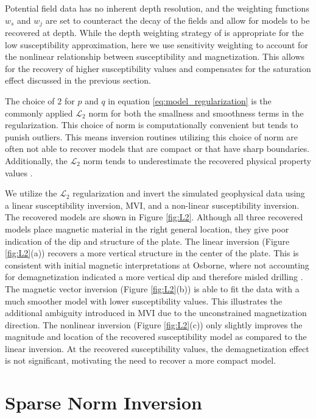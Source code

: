 \documentclass{segabs}
\begin{document}
Potential field data has no inherent depth resolution, and the weighting functions $w_s$ and $w_j$  are set to counteract the decay of the fields and allow for models to be recovered at depth. While the depth weighting strategy of \cite{Li1996} is appropriate for the low susceptibility approximation, here we use sensitivity weighting to account for the nonlinear relationship between susceptibility and magnetization. This allows for the recovery of higher susceptibility values and compensates for the saturation effect discussed in the previous section.

The choice of $2$ for $p$ and $q$ in equation \ref{eq:model_regularization} is the commonly applied $\mathcal{L}_2$ norm for both the smallness and smoothness terms in the regularization. This choice of norm is computationally convenient but tends to punish outliers. This means inversion routines utilizing this choice of norm are often not able to recover models that are compact or that have sharp boundaries. Additionally, the $\mathcal{L}_2$ norm tends to underestimate the recovered physical property values \citep{Oldenburg2005,Sun2020}.



We utilize the $\mathcal{L}_2$ regularization and invert the simulated geophysical data using a linear susceptibility inversion, MVI, and a non-linear susceptibility inversion. The recovered models are shown in Figure \ref{fig:L2}. Although all three recovered models place magnetic material in the right general location, they give poor indication of the dip and structure of the plate.  The linear inversion (Figure \ref{fig:L2}(a))  recovers a more vertical structure in the center of the plate. This is consistent with initial magnetic interpretations at Osborne, where not accounting for demagnetization indicated a more vertical dip and therefore misled drilling \citep{Clark2000}. The magnetic vector inversion (Figure \ref{fig:L2}(b)) is able to fit the data with a much smoother model with lower susceptibility values. This illustrates the additional ambiguity introduced in MVI due to the unconstrained magnetization direction. The nonlinear inversion (Figure \ref{fig:L2}(c)) only slightly improves the magnitude and location of the recovered susceptibility model as compared to the linear inversion.  At the recovered susceptibility values, the demagnetization effect is not significant, motivating the need to recover a more compact model.

\section{Sparse Norm Inversion}
\end{document}
